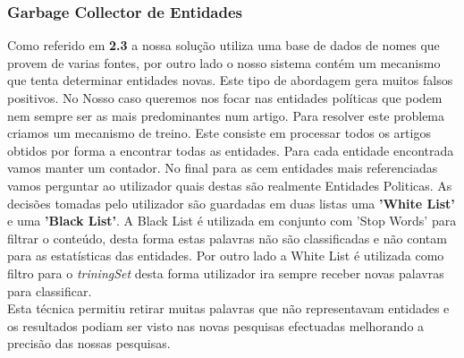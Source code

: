 \subsubsection{Garbage Collector de Entidades}
\hspace{15pt}Como referido em \textbf{2.3} a nossa solução utiliza uma base de dados de nomes que provem de varias fontes, por outro lado o nosso sistema contém um mecanismo que tenta determinar entidades novas. Este tipo de abordagem gera muitos falsos positivos. No Nosso caso queremos nos focar nas entidades políticas que podem nem sempre ser as mais predominantes num artigo. Para resolver este problema criamos um mecanismo de treino. Este consiste em processar todos os artigos obtidos por forma a encontrar todas as entidades. Para cada entidade encontrada vamos manter um contador. No final para as cem entidades mais referenciadas vamos perguntar ao utilizador quais destas são realmente Entidades Politicas. As decisões tomadas pelo utilizador são guardadas em duas listas uma \textbf{'White List'} e uma \textbf{'Black List'}. A Black List é utilizada em conjunto com 'Stop Words' para filtrar o conteúdo, desta forma estas palavras não são classificadas e não contam para as estatísticas das entidades. Por outro lado a White List é utilizada como filtro para o \textit{triningSet} desta forma utilizador ira sempre receber novas palavras para classificar.\\
Esta técnica permitiu retirar muitas palavras que não representavam entidades e os resultados podiam ser visto nas novas pesquisas efectuadas melhorando a precisão das nossas pesquisas. \\